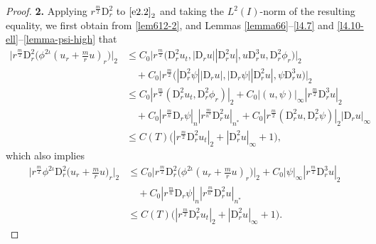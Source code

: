 \documentclass[11pt,reqno]{amsart}
\numberwithin{rk}{section}
\numberwithin{prop}{section}
\numberwithin{mydef}{section}
\numberwithin{lem}{section}
\numberwithin{equation}{section}
\numberwithin{thm}{section}
\begin{document}
\begin{proof}
\smallskip
\textbf{2.} Applying $r^\frac{m}{2}\mathrm{D}_r^2$ to $\eqref{e2.2}_2$ and taking the $L^2(I)$-norm of the resulting equality, we first obtain 
from \eqref{lem612-2}, and Lemmas \ref{lemma66}--\ref{l4.7} and \ref{l4.10-ell}--\ref{lemma-psi-high} that
\begin{equation*}
\begin{aligned}
\Big|r^\frac{m}{2}\mathrm{D}_r^2\big(\phi^{2\iota}(u_r+\frac{m}{r}u)_{r}\big)\Big|_2&\leq C_0\big|r^\frac{m}{2}\big(\mathrm{D}_r^2u_{t},|\mathrm{D}_r u|| \mathrm{D}_r^2u|,u\mathrm{D}_r^3u,\mathrm{D}_r^2\phi_{r}\big)\big|_2\\
&\quad +C_0\big|r^\frac{m}{2}\big(|\mathrm{D}_r^2\psi||\mathrm{D}_r u|,|\mathrm{D}_r\psi||\mathrm{D}_r^2 u|, \psi \mathrm{D}_r^3 u\big)\big|_2\\
&\leq C_0|r^\frac{m}{2}(\mathrm{D}_r^2u_{t},\mathrm{D}_r^2\phi_r)|_2+C_0|(u,\psi)|_\infty |r^\frac{m}{2}\mathrm{D}_r^3u|_2\\
&\quad +C_0 |r^\frac{m}{n} \mathrm{D}_r\psi|_n|r^\frac{m}{n^*}\mathrm{D}_r^2 u|_{n^*} + C_0|r^\frac{m}{2}(\mathrm{D}_r^2 u,\mathrm{D}_r^2\psi)|_2|\mathrm{D}_r u|_\infty \\
&\leq C(T)\big(|r^\frac{m}{2}\mathrm{D}_r^2 u_t|_2+|\mathrm{D}_r^2 u|_\infty+1\big),
\end{aligned}
\end{equation*}
which also implies
\begin{equation}\label{lem612-4}
\begin{aligned}
\Big|r^\frac{m}{2} \phi^{2\iota}\mathrm{D}_r^2\big(u_r+\frac{m}{r}u\big)_{r} \Big|_2
&\leq C_0\Big|r^\frac{m}{2}\mathrm{D}_r^2\big(\phi^{2\iota}(u_r+\frac{m}{r}u)_{r}\big)\Big|_2
+C_0|\psi|_\infty|r^\frac{m}{2}\mathrm{D}_r^3 u|_2\\
&\quad +C_0|r^\frac{m}{n}\mathrm{D}_r\psi|_n|r^\frac{m}{n^*}\mathrm{D}_r^2 u|_{n^*}\\
&\leq C(T)\big(|r^\frac{m}{2}\mathrm{D}_r^2 u_t|_2+|\mathrm{D}_r^2 u|_\infty+1\big).
\end{aligned}
\end{equation}


\end{proof}
\end{document}
